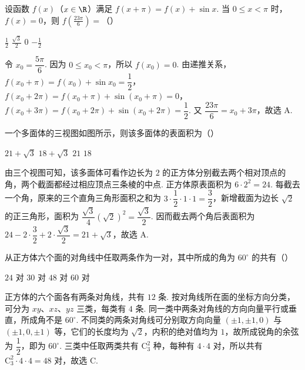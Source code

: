 \begin{problem}
设函数 \(f(x)\)（\(x \in \R\)）满足 \( f(x + \pi) = f(x) + \sin x \). 当 \( 0 \leqslant x < \pi \) 时，\( f(x) = 0 \)，则 \( f\left(\frac{23\pi}{6}\right) = \)（\quad）

\choices
    {\( \frac{1}{2} \)}
    {\( \frac{\sqrt{3}}{2} \)}
    {\(0\)}
    {\(-\frac{1}{2}\)}

\begin{solution}
令 \(x_0=\dfrac{5\pi}{6}\). 因为 \(0\leqslant x_0<\pi\)，所以 \(f(x_0)=0\). 由递推关系，\(f(x_0+\pi)=f(x_0)+\sin x_0=\dfrac12\)，\(f(x_0+2\pi)=f(x_0+\pi)+\sin(x_0+\pi)=0\)，\(f(x_0+3\pi)=f(x_0+2\pi)+\sin(x_0+2\pi)=\dfrac12\). 又 \(\dfrac{23\pi}{6}=x_0+3\pi\)，故选 A.
\end{solution}
\end{problem}

\begin{problem}
一个多面体的三视图如图所示，则该多面体的表面积为（\quad）


\choices
    {\(21 + \sqrt{3}\)}
    {\(18 + \sqrt{3}\)}
    {\(21\)}
    {\(18\)}

\begin{solution}
由三个视图可知，该多面体可看作边长为 \(2\) 的正方体分别截去两个相对顶点的角，两个截面都经过相应顶点三条棱的中点. 正方体原表面积为 \(6\cdot2^{2}=24\). 每截去一个角，原来的三个直角三角形面积之和为 \(3\cdot\dfrac12\cdot1\cdot1=\dfrac32\)，新增截面为边长 \(\sqrt{2}\) 的正三角形，面积为 \(\dfrac{\sqrt{3}}{4}(\sqrt{2})^{2}=\dfrac{\sqrt{3}}2\). 因而截去两个角后表面积为 \(24-2\cdot\dfrac32+2\cdot\dfrac{\sqrt{3}}2=21+\sqrt{3}\)，故选 A.
\end{solution}
\end{problem}

\begin{problem}
从正方体六个面的对角线中任取两条作为一对，其中所成的角为 \(60^{\circ}\) 的共有（\quad）

\choices
    {\(24\) 对}
    {\(30\) 对}
    {\(48\) 对}
    {\(60\) 对}

\begin{solution}
正方体的六个面各有两条对角线，共有 \(12\) 条. 按对角线所在面的坐标方向分类，可分为 \(xy\)、\(xz\)、\(yz\) 三类，每类有 \(4\) 条. 同一类中两条对角线的方向向量平行或垂直，所成角不是 \(60^{\circ}\). 不同类的两条对角线可分别取方向向量 \((\pm1,\pm1,0)\) 与 \((\pm1,0,\pm1)\) 等，它们的长度均为 \(\sqrt{2}\)，内积的绝对值均为 \(1\)，故所成锐角的余弦为 \(\dfrac{1}{2}\)，即为 \(60^{\circ}\). 三类中任取两类共有 \(\mathrm C_3^2\) 种，每种有 \(4\cdot4\) 对，所以共有 \(\mathrm C_3^2\cdot4\cdot4=48\) 对，故选 C.
\end{solution}
\end{problem}

